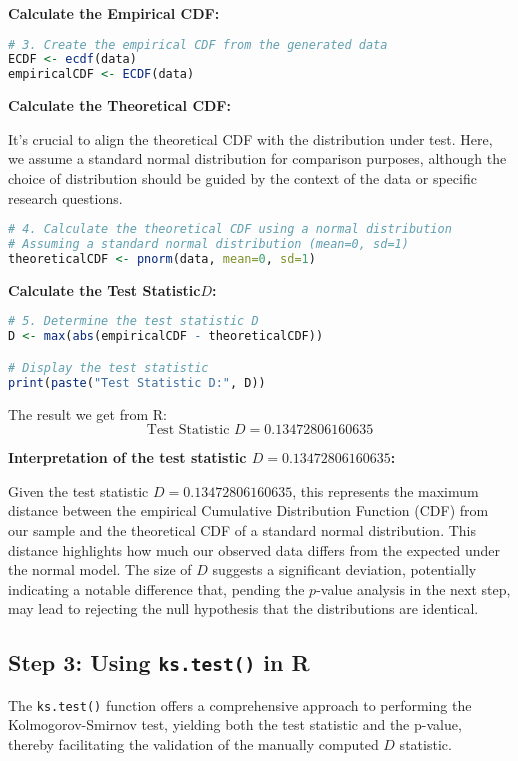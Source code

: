 \documentclass[12pt,letterpaper]{article}
\begin{document}
\textbf{Calculate the Empirical CDF:}

\begin{lstlisting}[language=R]
# 3. Create the empirical CDF from the generated data
ECDF <- ecdf(data)
empiricalCDF <- ECDF(data)
\end{lstlisting}

\textbf{Calculate the Theoretical CDF:}
\vspace{5mm} %

It's crucial to align the theoretical CDF with the distribution under test. Here, we assume a standard normal distribution for comparison purposes, although the choice of distribution should be guided by the context of the data or specific research questions.

\begin{lstlisting}[language=R]
# 4. Calculate the theoretical CDF using a normal distribution
# Assuming a standard normal distribution (mean=0, sd=1)
theoreticalCDF <- pnorm(data, mean=0, sd=1)
\end{lstlisting}

\textbf{Calculate the Test Statistic\( D \):}
\begin{lstlisting}[language=R]
# 5. Determine the test statistic D
D <- max(abs(empiricalCDF - theoreticalCDF))

# Display the test statistic
print(paste("Test Statistic D:", D))
\end{lstlisting}

The result we get from R:
\begin{equation}
\text{Test Statistic } D = 0.13472806160635
\end{equation}

\textbf{Interpretation of the test statistic \( D = 0.13472806160635 \):}

Given the test statistic \( D = 0.13472806160635 \), this represents the maximum distance between the empirical Cumulative Distribution Function (CDF) from our sample and the theoretical CDF of a standard normal distribution. This distance highlights how much our observed data differs from the expected under the normal model. The size of \( D \) suggests a significant deviation, potentially indicating a notable difference that, pending the \( p \)-value analysis in the next step, may lead to rejecting the null hypothesis that the distributions are identical.


\subsection*{Step 3: Using \texttt{ks.test()} in R}
The \texttt{ks.test()} function offers a comprehensive approach to performing the Kolmogorov-Smirnov test, yielding both the test statistic and the p-value, thereby facilitating the validation of the manually computed \( D \) statistic.
\end{document}
